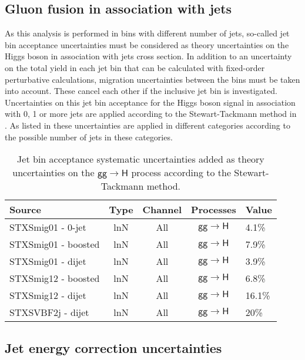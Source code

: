 \subsection{Gluon fusion in association with jets}
As this analysis is performed in bins with different number of jets, so-called jet bin acceptance uncertainties must be considered as theory uncertainties on the Higgs boson in association with jets cross section. 
In addition to an uncertainty on the total yield in each jet bin that can be calculated with fixed-order perturbative calculations, migration uncertainties between the bins must be taken into account. These cancel each other if the inclusive jet bin is investigated.
Uncertainties on this jet bin acceptance for the Higgs boson signal in association with 0, 1 or more jets are applied according to the Stewart-Tackmann method in \cite{Heinemeyer:2013tqa,PhysRevD.85.034011}.
As listed in  these uncertainties are applied in different categories according to the possible number of jets in these categories.
\begin{table}[!]
    \centering
    \caption{Jet bin acceptance systematic uncertainties added as theory uncertainties on the $\mathsf{gg\rightarrow H}$ process according to the Stewart-Tackmann method.}\label{SU:jetbinuncs}
    \begin{tabular}{lcccl}
        \toprule  
        Source              & Type   & Channel & Processes & Value \\ \hline
        STXSmig01 - 0-jet   & lnN    & All     & $\mathsf{gg\rightarrow H}$ & 4.1\%  \\ 
        STXSmig01 - boosted & lnN    & All     & $\mathsf{gg\rightarrow H}$ & 7.9\%  \\ 
        STXSmig01 - dijet   & lnN    & All     & $\mathsf{gg\rightarrow H}$ & 3.9\%  \\ 
        STXSmig12 - boosted & lnN    & All     & $\mathsf{gg\rightarrow H}$ & 6.8\%  \\ 
        STXSmig12 - dijet   & lnN    & All     & $\mathsf{gg\rightarrow H}$ & 16.1\% \\ 
        STXSVBF2j - dijet   & lnN    & All     & $\mathsf{gg\rightarrow H}$ & 20\%   \\ 
    \end{tabular}
\end{table}

\subsection{Jet energy correction uncertainties}


